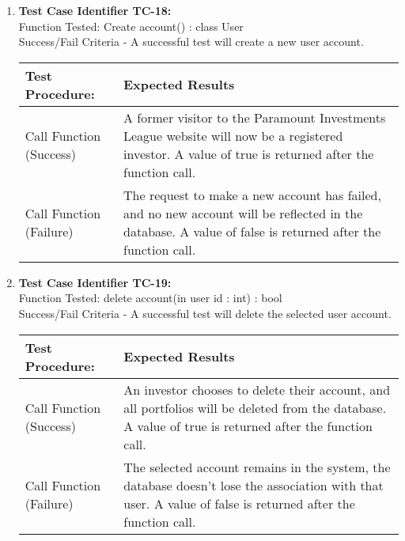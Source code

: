 \begin{enumerate}
  \item
    \textbf{Test Case Identifier TC-18:}\\

    Function Tested: Create account() : class User \\

    Success/Fail Criteria - A successful test will create a new user account. \\

    \begin{longtable}{|p{2in}|p{4.5in}|}
    \hline
    {\large \color{color1}Test Procedure:}&{\large \color{color1}Expected Results}\\ \hline
    Call Function (Success) & A former visitor to the Paramount Investments
    League website will now be a registered investor.  A value of true is
    returned after the function call.
    \\ \hline
    Call Function (Failure) & The request to make a new account has failed, and
    no new account will be reflected in the database. A value of false is
    returned after the function call.\\ \hline
    \end{longtable}
    \vspace{5mm}

  \item
    \textbf{Test Case Identifier TC-19:}\\

    Function Tested: delete account(in user id : int) : bool \\

    Success/Fail Criteria - A successful test will delete the selected user
    account. \\

    \begin{longtable}{|p{2in}|p{4.5in}|}
    \hline
    {\large \color{color1}Test Procedure:}&{\large \color{color1}Expected Results}\\ \hline
    Call Function (Success) & An investor chooses to delete their account, and
    all portfolios will be deleted from the database.  A value of true is
    returned after the function call.
    \\ \hline
    Call Function (Failure) & The selected account remains in the system, the
    database doesn’t lose the association with that user. A value of false is
    returned after the function call.\\ \hline
    \end{longtable}
    \vspace{5mm}

\end{enumerate}

